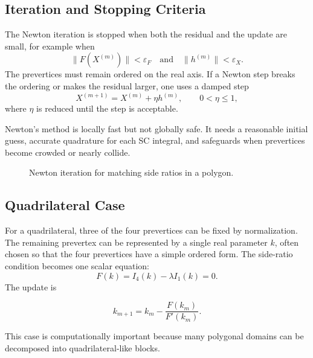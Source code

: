 \documentclass[12pt,a4paper]{article}
\begin{document}
\subsection{Iteration and Stopping Criteria}

The Newton iteration is stopped when both the residual and the update are small, for example when
\[
\|F(X^{(m)})\|<\varepsilon_F
\quad \text{and}\quad
\|h^{(m)}\|<\varepsilon_X.
\]
The prevertices must remain ordered on the real axis. If a Newton step breaks the ordering or makes the residual larger, one uses a damped step
\[
X^{(m+1)}=X^{(m)}+\eta h^{(m)},\qquad 0<\eta\le 1,
\]
where \(\eta\) is reduced until the step is acceptable.

\begin{importantbox}
Newton's method is locally fast but not globally safe. It needs a reasonable initial guess, accurate quadrature for each SC integral, and safeguards when prevertices become crowded or nearly collide.
\end{importantbox}

\begin{figure}[H]
\centering
{}
\caption{Newton iteration for matching side ratios in a polygon.}
\end{figure}

\subsection{Quadrilateral Case}

For a quadrilateral, three of the four prevertices can be fixed by normalization. The remaining prevertex can be represented by a single real parameter \(k\), often chosen so that the four prevertices have a simple ordered form. The side-ratio condition becomes one scalar equation:
\[
F(k)=I_4(k)-\lambda I_1(k)=0.
\]
The update is
\begin{formulabox}
\[
k_{m+1}=k_m-\frac{F(k_m)}{F'(k_m)}.
\]
\end{formulabox}
This case is computationally important because many polygonal domains can be decomposed into quadrilateral-like blocks.
\end{document}
